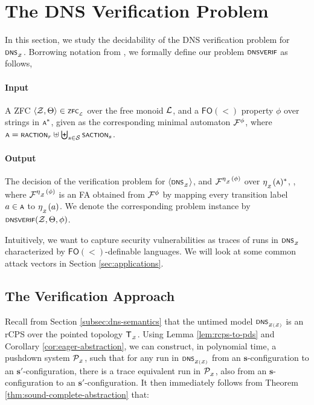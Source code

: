 \section{\label{sec:property-validation-to-reachability}The DNS Verification Problem}
In this section, we  study the decidability of the DNS verification problem for $\scrsf{dns}\subsub{\cal Z}$. Borrowing notation from  , we formally define our problem $\verif$ as follows,


\paragraph{\textbf{Input}}
A ZFC $\tup{\cal Z,\Theta} \in \scrsf{zfc}\subsub{\cal L}$ over the free monoid $\cal L$, and a $\mathsf{FO}(<)$ property $\phi$ over strings in $\scrsf{a}^*$, given as the corresponding minimal automaton $\cal F^\phi$, where $\scrsf{a} = \scrsf{raction}_r \uplus \biguplus_{s \in \cal S} \scrsf{saction}_s$.
\paragraph{\textbf{Output}}
The decision of the verification problem for $\tup{\scrsf{dns}\subsub{\cal Z}}$, and $\cal F^{\synhomZ(\phi)}$ over $\synhomZ(\scrsf{a})^*$, , where $\cal F^{\synhomZ(\phi)}$ is an FA obtained from $\cal F^\phi$ by mapping every transition label $a \in \scrsf{a}$ to  $\synhomZ(a)$. We denote the corresponding problem instance by $\verif(\cal Z, \Theta, \phi)$. 

 Intuitively, we want to capture security vulnerabilities as traces of runs in $\scrsf{dns}\subsub{\cal Z}$ characterized by $\mathsf{FO}(<)$-definable
languages. We will look at some common attack vectors in Section \ref{sec:applications}.




\subsection{The Verification Approach}

Recall from Section \ref{subsec:dns-semantics} that the untimed model $\abstraction$ is an rCPS over the pointed topology $\mathsf T\subsub{\cal Z}$. Using Lemma \ref{lem:rcps-to-pds} and Corollary \ref{cor:eager-abstraction}, we can construct, in polynomial time, a pushdown system $\cal P\subsub{\cal Z}$, such that for any run in $\abstraction$ from an $\mathbf{s}$-configuration to an $\mathbf{s}'$-configuration, there is a trace equivalent run in $\cal P\subsub{\cal Z}$, also from an $\mathbf{s}$-configuration to an $\mathbf{s}'$-configuration. It then immediately follows from Theorem \ref{thm:sound-complete-abstraction} that:

